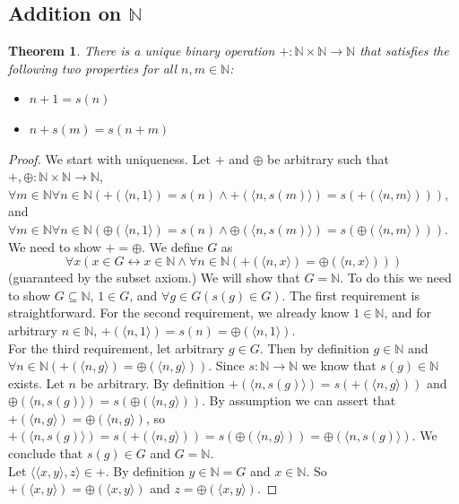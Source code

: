 \documentclass{report}
\newtheorem{theorem}[theo]{Theorem}
\begin{document}
\subsection{Addition on $\mathbb N$}
\begin{theorem}
There is a unique binary operation $+:\mathbb N\times\mathbb N\to\mathbb N$ that satisfies the following two properties for all $n,m\in\mathbb N$:
\begin{itemize}
\item $n+1=s(n)$
\item $n+s(m)=s(n+m)$
\end{itemize}
\end{theorem}
\begin{proof}
We start with uniqueness. Let $+$ and $\oplus$ be arbitrary such that $+,\oplus:\mathbb N\times\mathbb N\to\mathbb N$, 
$\forall m\in\mathbb N\forall n\in\mathbb N(+(\langle n,1\rangle)=s(n)\land+(\langle n,s(m)\rangle)=s(+(\langle n,m\rangle)))$, and 
$\forall m\in\mathbb N\forall n\in\mathbb N(\oplus(\langle n,1\rangle)=s(n)\land\oplus(\langle n,s(m)\rangle)=s(\oplus(\langle n,m\rangle)))$. We need to show $+=\oplus$. 
We define $G$ as
\begin{equation*}
\forall x(x\in G\leftrightarrow x\in\mathbb N\land\forall n\in\mathbb N(+(\langle n,x\rangle)=\oplus(\langle n,x\rangle)))
\end{equation*}
(guaranteed by the subset axiom.) We will show that $G=\mathbb N$. To do this we need to show
$G\subseteq\mathbb N$, $1\in G$, and $\forall g\in G(s(g)\in G)$. The first requirement is straightforward. For the second requirement, we already know $1\in\mathbb N$, and for arbitrary 
$n\in\mathbb N$, $+(\langle n,1\rangle)=s(n)=\oplus(\langle n,1\rangle)$.\\
\indent For the third requirement, let arbitrary $g\in G$. Then by definition $g\in\mathbb N$ and $\forall n\in\mathbb N(+(\langle n,g\rangle)=\oplus(\langle n,g\rangle))$.
Since $s:\mathbb N\to\mathbb N$ we know that $s(g)\in\mathbb N$ exists. Let $n$ be arbitrary. By definition
$+(\langle n,s(g)\rangle)=s(+(\langle n,g\rangle))$ and $\oplus(\langle n,s(g)\rangle)=s(\oplus(\langle n,g\rangle))$. 
By assumption we can assert that $+(\langle n,g\rangle)=\oplus(\langle n,g\rangle)$, so 
$+(\langle n,s(g)\rangle)=s(+(\langle n,g\rangle))=s(\oplus(\langle n,g\rangle))=\oplus(\langle n,s(g)\rangle)$. We conclude that $s(g)\in G$ and $G=\mathbb N$.\\
\indent Let $\langle\langle x,y\rangle,z\rangle\in+$. By definition $y\in\mathbb N=G$ and $x\in\mathbb N$. So $+(\langle x,y\rangle)=\oplus(\langle x,y\rangle)$ and $z=\oplus(\langle x,y\rangle)$.

\end{proof}
\end{document}
